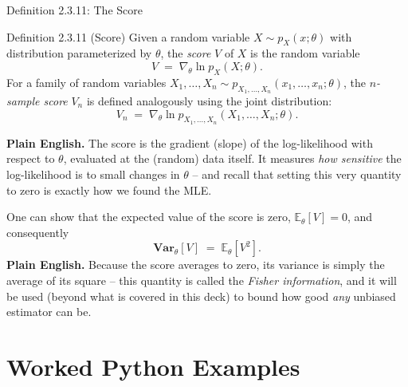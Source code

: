 \documentclass[aspectratio=169,10pt]{beamer}
\begin{document}
\begin{frame}{Definition 2.3.11: The Score}
  \begin{block}{Definition 2.3.11 (Score)}
    Given a random variable $X \sim p_X(x;\theta)$ with distribution
    parameterized by $\theta$, the \emph{score} $V$ of $X$ is the random
    variable
    \[
      V \;=\; \nabla_\theta \ln p_X(X;\theta).
    \]
    For a family of random variables $X_1,\dots,X_n \sim
    p_{X_1,\dots,X_n}(x_1,\dots,x_n;\theta)$, the \emph{$n$-sample score}
    $V_n$ is defined analogously using the joint distribution:
    \[
      V_n \;=\; \nabla_\theta \ln p_{X_1,\dots,X_n}(X_1,\dots,X_n;\theta).
    \]
  \end{block}
  \textbf{Plain English.} The score is the gradient (slope) of the
  log-likelihood with respect to $\theta$, evaluated at the (random) data
  itself. It measures \emph{how sensitive} the log-likelihood is to small
  changes in $\theta$ -- and recall that setting this very quantity to zero
  is exactly how we found the MLE.

  One can show that the expected value of the score is zero,
  $\mathbb{E}_\theta[V]=0$, and consequently
  \[
    \mathbf{Var}_\theta[V] \;=\; \mathbb{E}_\theta[V^2].
  \]
  \textbf{Plain English.} Because the score averages to zero, its variance
  is simply the average of its square -- this quantity is called the
  \emph{Fisher information}, and it will be used (beyond what is covered
  in this deck) to bound how good \emph{any} unbiased estimator can be.
\end{frame}

\section{Worked Python Examples}
\end{document}
